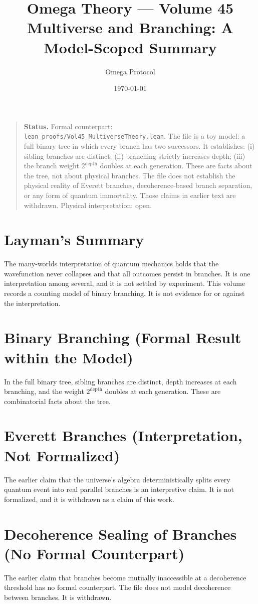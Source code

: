 \documentclass[11pt, a4paper]{article}
\title{Omega Theory --- Volume 45\\\Large Multiverse and Branching: A Model-Scoped Summary}
\author{Omega Protocol}
\date{\today}
\begin{document}
\maketitle

\begin{quote}
\textbf{Status.} Formal counterpart: \texttt{lean\_proofs/Vol45\_MultiverseTheory.lean}. The file is a toy model: a full binary tree in which every branch has two successors. It establishes: (i) sibling branches are distinct; (ii) branching strictly increases depth; (iii) the branch weight $2^{\text{depth}}$ doubles at each generation. These are facts about the tree, not about physical branches. The file does not establish the physical reality of Everett branches, decoherence-based branch separation, or any form of quantum immortality. Those claims in earlier text are withdrawn. Physical interpretation: open.
\end{quote}

\section*{Layman's Summary}
The many-worlds interpretation of quantum mechanics holds that the wavefunction never collapses and that all outcomes persist in branches. It is one interpretation among several, and it is not settled by experiment. This volume records a counting model of binary branching. It is not evidence for or against the interpretation.

\section{Binary Branching (Formal Result within the Model)}
In the full binary tree, sibling branches are distinct, depth increases at each branching, and the weight $2^{\text{depth}}$ doubles at each generation. These are combinatorial facts about the tree.

\section{Everett Branches (Interpretation, Not Formalized)}
The earlier claim that the universe's algebra deterministically splits every quantum event into real parallel branches is an interpretive claim. It is not formalized, and it is withdrawn as a claim of this work.

\section{Decoherence Sealing of Branches (No Formal Counterpart)}
The earlier claim that branches become mutually inaccessible at a decoherence threshold has no formal counterpart. The file does not model decoherence between branches. It is withdrawn.
\end{document}
